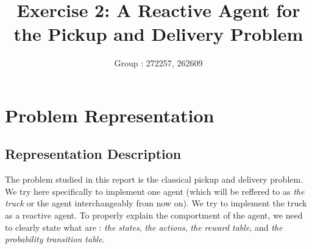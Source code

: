 \documentclass[11pt]{article}
\title{\bf Exercise 2: A Reactive Agent for the Pickup and Delivery Problem}
\author{Group \textnumero: 272257, 262609}
\begin{document}
\maketitle

\section{Problem Representation}

\subsection{Representation Description}

 	The problem studied in this report is the classical pickup and delivery problem. We try here specifically to implement one agent (which will be reffered to as \emph{the truck} or the agent interchangeably from now on). We try to implement the truck as a reactive agent. 
 	To properly explain the comportment of the agent, we need to clearly state what are : \emph{the states}, \emph{the actions}, \emph{the reward table}, and \emph{the probability transition table}.
\end{document}
